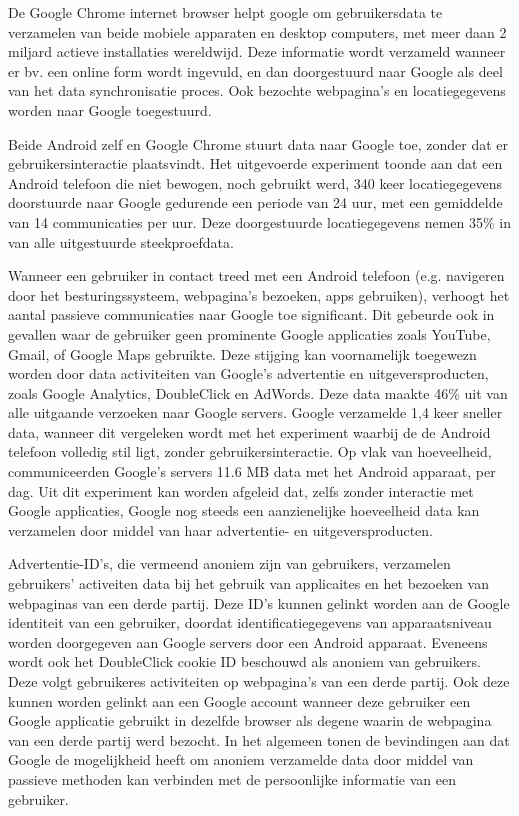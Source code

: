 De Google Chrome internet browser helpt google om gebruikersdata te verzamelen van beide mobiele apparaten en desktop computers, met meer daan 2 miljard actieve installaties wereldwijd. Deze informatie wordt verzameld wanneer er bv. een online form wordt ingevuld, en dan doorgestuurd naar Google als deel van het data synchronisatie proces. Ook bezochte webpagina's en locatiegegevens worden naar Google toegestuurd.

Beide Android zelf en Google Chrome stuurt data naar Google toe, zonder dat er gebruikersinteractie plaatsvindt. Het uitgevoerde experiment toonde aan dat een Android telefoon die niet bewogen, noch gebruikt werd, 340 keer locatiegegevens doorstuurde naar Google gedurende een periode van 24 uur, met een gemiddelde van 14 communicaties per uur. Deze doorgestuurde locatiegegevens nemen 35\% in van alle uitgestuurde steekproefdata.

Wanneer een gebruiker in contact treed met een Android telefoon (e.g. navigeren door het besturingssysteem, webpagina's bezoeken, apps gebruiken), verhoogt het aantal passieve communicaties naar Google toe significant. Dit gebeurde ook in gevallen waar de gebruiker geen prominente Google applicaties zoals YouTube, Gmail, of Google Maps gebruikte. Deze stijging kan voornamelijk toegewezn worden door data activiteiten van Google's advertentie en uitgeversproducten, zoals Google Analytics, DoubleClick en AdWords. Deze data maakte 46\% uit van alle uitgaande verzoeken naar Google servers. Google verzamelde 1,4 keer sneller data, wanneer dit vergeleken wordt met het experiment waarbij de de Android telefoon volledig stil ligt, zonder gebruikersinteractie. Op vlak van hoeveelheid, communiceerden Google's servers 11.6 MB data met het Android apparaat, per dag. Uit dit experiment kan worden afgeleid dat, zelfs zonder interactie met Google applicaties, Google nog steeds een aanzienelijke hoeveelheid data kan verzamelen door middel van haar advertentie- en uitgeversproducten.

Advertentie-ID's, die vermeend anoniem zijn van gebruikers, verzamelen  gebruikers' activeiten data bij het gebruik van applicaites en het bezoeken van webpaginas van een derde partij. Deze ID's kunnen gelinkt worden aan de Google identiteit van een gebruiker, doordat identificatiegegevens van apparaatsniveau worden doorgegeven aan Google servers door een Android apparaat. Eveneens wordt ook het DoubleClick cookie ID beschouwd als anoniem van gebruikers. Deze volgt gebruikeres activiteiten op webpagina's van een derde partij. Ook deze kunnen worden gelinkt aan een Google account wanneer deze gebruiker een Google applicatie gebruikt in dezelfde browser als degene waarin de webpagina van een derde partij werd bezocht. In het algemeen tonen de bevindingen aan dat Google de mogelijkheid heeft om anoniem verzamelde data door middel van passieve methoden kan verbinden met de persoonlijke informatie van een gebruiker.

